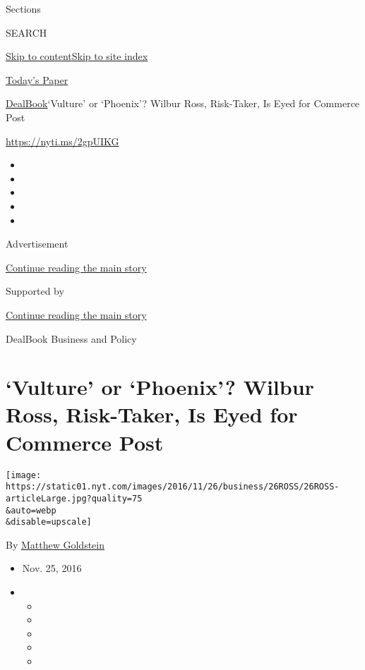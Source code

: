 Sections

SEARCH

\protect\hyperlink{site-content}{Skip to
content}\protect\hyperlink{site-index}{Skip to site index}

\href{https://myaccount.nytimes.com/auth/login?response_type=cookie\&client_id=vi}{}

\href{https://www.nytimes.com/section/todayspaper}{Today's Paper}

\href{/section/business/dealbook}{DealBook}\textbar{}`Vulture' or
`Phoenix'? Wilbur Ross, Risk-Taker, Is Eyed for Commerce Post

\url{https://nyti.ms/2gpUIKG}

\begin{itemize}
\item
\item
\item
\item
\item
\end{itemize}

Advertisement

\protect\hyperlink{after-top}{Continue reading the main story}

Supported by

\protect\hyperlink{after-sponsor}{Continue reading the main story}

DealBook Business and Policy

\hypertarget{vulture-or-phoenix-wilbur-ross-risk-taker-is-eyed-for-commerce-post}{%
\section{`Vulture' or `Phoenix'? Wilbur Ross, Risk-Taker, Is Eyed for
Commerce
Post}\label{vulture-or-phoenix-wilbur-ross-risk-taker-is-eyed-for-commerce-post}}

\texttt{[image: https://static01.nyt.com/images/2016/11/26/business/26ROSS/26ROSS-articleLarge.jpg?quality=75\\\&auto=webp\\\&disable=upscale]}

By \href{http://www.nytimes.com/by/matthew-goldstein}{Matthew Goldstein}

\begin{itemize}
\item
  Nov. 25, 2016
\item
  \begin{itemize}
  \item
  \item
  \item
  \item
  \item
  \end{itemize}
\end{itemize}

